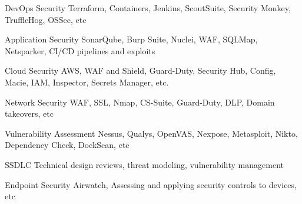 
\begin{cvskills}

  \cvskill
    {DevOps Security} %
    {Terraform, Containers, Jenkins, ScoutSuite, Security Monkey, TruffleHog, OSSec, etc} %

  \cvskill
    {Application Security} %
    {SonarQube, Burp Suite, Nuclei, WAF, SQLMap, Netsparker, CI/CD pipelines and exploits } %

  \cvskill
    {Cloud Security} %
    {AWS, WAF and Shield, Guard-Duty, Security Hub, Config, Macie, IAM, Inspector, Secrets Manager, etc.} %

  \cvskill
    {Network Security} %
    {WAF, SSL, Nmap, CS-Suite, Guard-Duty, DLP, Domain takeovers, etc } %

  \cvskill
    {Vulnerability Assessment } %
    {Nessus, Qualys, OpenVAS, Nexpose, Metasploit, Nikto, Dependency Check, DockScan, etc } %

  \cvskill
    {SSDLC}
    {Technical design reviews, threat modeling, vulnerability management} %

  \cvskill
    {Endpoint Security} %
    {Airwatch, Assessing and applying security controls to devices, etc } 

\end{cvskills}
